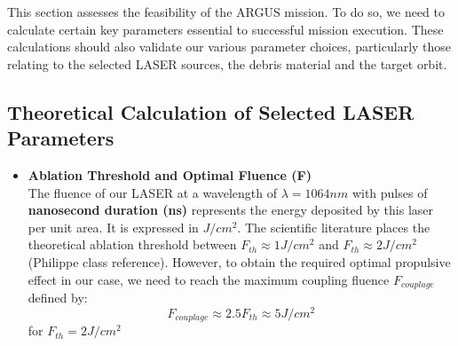 
This section assesses the feasibility of the ARGUS mission. 
To do so, we need to calculate certain key parameters essential to successful mission execution. 
These calculations should also validate our various parameter choices, 
particularly those relating to the selected LASER sources, 
the debris material and the target orbit.  
\subsection{Theoretical Calculation of Selected LASER Parameters}
\begin{itemize}
    \item \textbf{Ablation Threshold and Optimal Fluence (F)}\\
    The fluence of our LASER at a wavelength of $\lambda = 1064 nm$ with pulses of \textbf{nanosecond duration (ns)} 
    represents the energy deposited by this laser per unit area. It is expressed in \textbf{$J/cm^{2}$}. 
    The scientific literature places the theoretical ablation threshold between $F_{th} \approx 1 J/cm^{2}$ and $F_{th} \approx 2   J/cm^{2}$ (Philippe class reference).
    However, to obtain the required optimal propulsive effect in our case, we need to reach the maximum coupling fluence $F_{couplage}$ defined by: \\
    \begin{equation}
    \boxed{F_{couplage} \approx  2.5 F_{th} \approx  5 J/cm^{2}}
    \end{equation}
    for $F_{th} = 2 J/cm^{2}$\\


\end{itemize}
